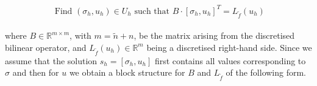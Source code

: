 \documentclass[../draft_1.tex]{subfiles}
\begin{document}
\begin{ceqn}
	\begin{align}
	\begin{aligned}
	\text{ Find } (\sigma_h, u_h) \in U_h \text{ such that } B \cdot [\sigma_h, u_h]^T  = L_{\tilde{f}}(u_h) 
	\end{aligned}
	\end{align}
\end{ceqn}

where $B \in \mathbb{R}^{m \times m}$, with $ m = \tilde{n} + n$, be the matrix arising from the discretised bilinear operator, and $L_{\tilde{f}}(u_h) \in \mathbb{R}^m$ being a discretised right-hand side. Since we assume that the solution $s_h = [\sigma_h, u_h]$ first contains all values corresponding to $\sigma$ and then for $u$ we obtain a block structure for $B$ and $L_{\tilde{f}}$ of the following form.
\end{document}
